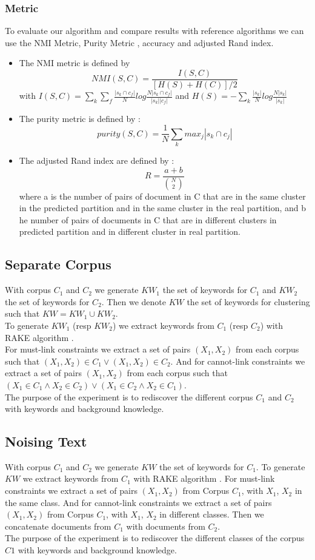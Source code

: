 \subsubsection{Metric}
To evaluate our algorithm and compare results with reference algorithms we can
use the NMI Metric, Purity Metric \cite{measure}, accuracy and adjusted
Rand index. 
\begin{itemize}
\item The NMI metric is defined by
$$
NMI(S,C) = \frac{I(S,C)}{[H(S)+H(C)]/2}
$$ 
with
$
I(S,C) =\sum_k \sum_f\frac{|s_k \cap c_f|}{N}log\frac{N|s_k \cap c_f|}{|s_k| |c_f|}
$ and $
H(S) = -\sum_k\frac{|s_k|}{N}log\frac{N|s_k|}{|s_k|}
$
\item The purity metric is defined by :
$$
purity(S,C) = \frac{1}{N}\sum_k {max}_j|s_k \cap c_j|
$$
\item The adjusted Rand index are defined by :
  $$R = \frac{a+b}{\binom{N}{2}}$$
  where a is the number of pairs of document in C
  that are in the same cluster in the predicted partition and in the
  same cluster in the real partition, and b he number of pairs of
  documents in C that are in different clusters in predicted partition
  and in different cluster in real partition.
\end{itemize}
\subsection{Separate Corpus }
With corpus $C_1$ and $C_2$ we generate $KW_1$ the set of keywords
for $C_1$ and $KW_2$ the set of keywords for $C_2$. Then we denote $KW$
the set of keywords for clustering such that $KW = KW_1 \cup KW_2$.\\
To generate $KW_1$ (resp $KW_2$) we extract keywords from $C_1$ (resp $C_2$)
with RAKE algorithm \cite{rake}.\\
For must-link constraints we extract a set of pairs $(X_1, X_2)$ from each
corpus such that $(X_1, X_2) \in C_1 \vee (X_1, X_2) \in C_2$.
And for cannot-link constraints we extract a set of pairs $(X_1, X_2)$ from
each corpus such that $(X_1 \in C_1 \wedge  X_2 \in C_2)\vee (X_1 \in C_2 \wedge
X_2 \in C_1)$.\\
The purpose of the experiment is to rediscover the different corpus $C_1$ and
$C_2$ with keywords and background knowledge.
\subsection{Noising Text}
With corpus $C_1$ and $C_2$ we generate $KW$ the set of keywords
for $C_1$.
To generate $KW$ we extract keywords from $C_1$ with RAKE algorithm \cite{rake}.
For must-link constraints we extract a set of pairs $(X_1, X_2)$ from Corpus
$C_1$, with $X_1$, $X_2$ in the same class.
And for cannot-link constraints we extract a set of pairs $(X_1, X_2)$ from Corpus
$C_1$, with $X_1$, $X_2$ in different classes.
Then we concatenate documents from $C_1$ with documents from $C_2$.\\
The purpose of the experiment is to rediscover the different classes of the
corpus $C1$ with keywords and background knowledge.
